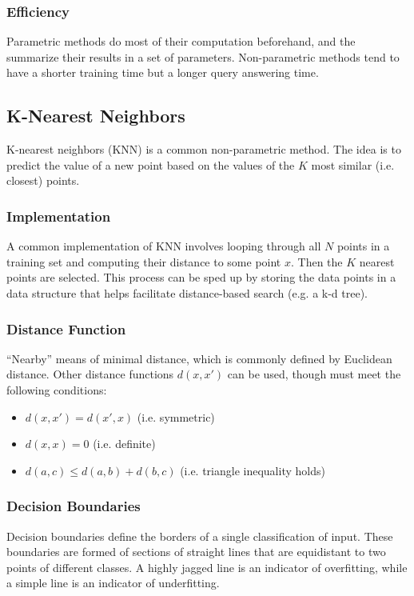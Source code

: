 \documentclass[12pt]{article}
\begin{document}
        \subsubsection{Efficiency}
            Parametric methods do most of their computation beforehand, and the summarize their results in a set of parameters. Non-parametric methods tend to
            have a shorter training time but a longer query answering time.

    \subsection{K-Nearest Neighbors}
        K-nearest neighbors (KNN) is a common non-parametric method. The idea is to predict the value of a new point based on the values of the $K$ most similar
        (i.e. closest) points.

        \subsubsection{Implementation}
            A common implementation of KNN involves looping through all $N$ points in a training set and computing their distance to some point $x$. Then the $K$ nearest
            points are selected. This process can be sped up by storing the data points in a data structure that helps facilitate distance-based search (e.g. a k-d tree).

        \subsubsection{Distance Function}
            ``Nearby'' means of minimal distance, which is commonly defined by Euclidean distance. Other distance functions $d(x, x')$ can be used, though must meet
            the following conditions:
            \begin{itemize}
              \item $d(x, x') = d(x', x)$ (i.e. symmetric)
              \item $d(x, x) = 0$ (i.e. definite)
              \item $d(a, c) \leq d(a, b) + d(b, c)$ (i.e. triangle inequality holds)
            \end{itemize}

        \subsubsection{Decision Boundaries}
            Decision boundaries define the borders of a single classification of input. These boundaries are formed of sections of straight lines that are equidistant
            to two points of different classes. A highly jagged line is an indicator of overfitting, while a simple line is an indicator of underfitting.
\end{document}
